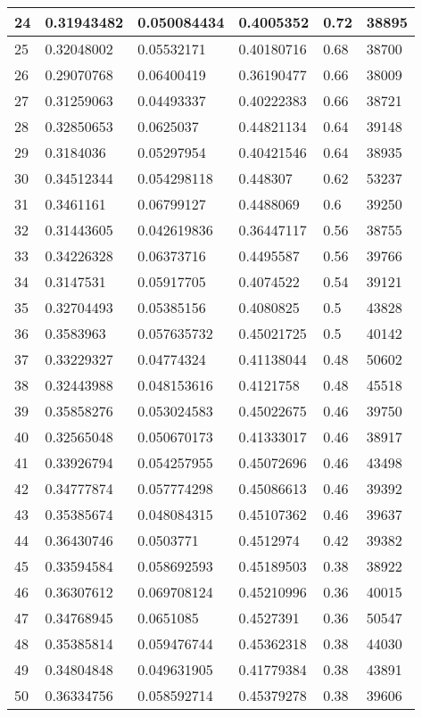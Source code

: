 \begin{longtable}{|l|l|l|l|l|l|}
24 & 0.31943482 & 0.050084434 & 0.4005352 & 0.72 & 38895 \\ \hline 
25 & 0.32048002 & 0.05532171 & 0.40180716 & 0.68 & 38700 \\ \hline 
26 & 0.29070768 & 0.06400419 & 0.36190477 & 0.66 & 38009 \\ \hline 
27 & 0.31259063 & 0.04493337 & 0.40222383 & 0.66 & 38721 \\ \hline 
28 & 0.32850653 & 0.0625037 & 0.44821134 & 0.64 & 39148 \\ \hline 
29 & 0.3184036 & 0.05297954 & 0.40421546 & 0.64 & 38935 \\ \hline 
30 & 0.34512344 & 0.054298118 & 0.448307 & 0.62 & 53237 \\ \hline 
31 & 0.3461161 & 0.06799127 & 0.4488069 & 0.6 & 39250 \\ \hline 
32 & 0.31443605 & 0.042619836 & 0.36447117 & 0.56 & 38755 \\ \hline 
33 & 0.34226328 & 0.06373716 & 0.4495587 & 0.56 & 39766 \\ \hline 
34 & 0.3147531 & 0.05917705 & 0.4074522 & 0.54 & 39121 \\ \hline 
35 & 0.32704493 & 0.05385156 & 0.4080825 & 0.5 & 43828 \\ \hline 
36 & 0.3583963 & 0.057635732 & 0.45021725 & 0.5 & 40142 \\ \hline 
37 & 0.33229327 & 0.04774324 & 0.41138044 & 0.48 & 50602 \\ \hline 
38 & 0.32443988 & 0.048153616 & 0.4121758 & 0.48 & 45518 \\ \hline 
39 & 0.35858276 & 0.053024583 & 0.45022675 & 0.46 & 39750 \\ \hline 
40 & 0.32565048 & 0.050670173 & 0.41333017 & 0.46 & 38917 \\ \hline 
41 & 0.33926794 & 0.054257955 & 0.45072696 & 0.46 & 43498 \\ \hline 
42 & 0.34777874 & 0.057774298 & 0.45086613 & 0.46 & 39392 \\ \hline 
43 & 0.35385674 & 0.048084315 & 0.45107362 & 0.46 & 39637 \\ \hline 
44 & 0.36430746 & 0.0503771 & 0.4512974 & 0.42 & 39382 \\ \hline 
45 & 0.33594584 & 0.058692593 & 0.45189503 & 0.38 & 38922 \\ \hline 
46 & 0.36307612 & 0.069708124 & 0.45210996 & 0.36 & 40015 \\ \hline 
47 & 0.34768945 & 0.0651085 & 0.4527391 & 0.36 & 50547 \\ \hline 
48 & 0.35385814 & 0.059476744 & 0.45362318 & 0.38 & 44030 \\ \hline 
49 & 0.34804848 & 0.049631905 & 0.41779384 & 0.38 & 43891 \\ \hline 
50 & 0.36334756 & 0.058592714 & 0.45379278 & 0.38 & 39606 \\ \hline 
\end{longtable}